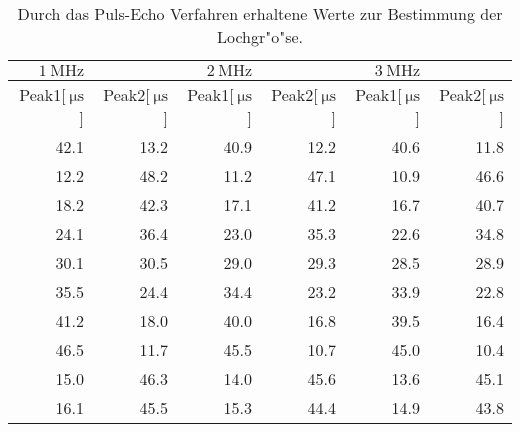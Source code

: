 
\begin{table}[!h]
\begin{center}
\begin{tabular}{|r|r|r|r|r|r|}
\hline
 $\SI{1}{\mega\hertz}$ && $\SI{2}{\mega\hertz}$ && $\SI{3}{\mega\hertz}$&\\
\hline
Peak1[$\SI{}{\micro\second}$] & Peak2[$\SI{}{\micro\second}$] & Peak1[$\SI{}{\micro\second}$] & Peak2[$\SI{}{\micro\second}$] & Peak1[$\SI{}{\micro\second}$] & Peak2[$\SI{}{\micro\second}$]\\
\hline
\hline
42.1 &	13.2 &	40.9 &	12.2 &	40.6 &	11.8\\
12.2 &	48.2 &	11.2 &	47.1 &	10.9 &	46.6\\
18.2 &	42.3 &	17.1 &	41.2 &	16.7 &	40.7\\
24.1 &	36.4 &	23.0 &	35.3 &	22.6 &	34.8\\
30.1 &	30.5 &	29.0 &	29.3 &	28.5 &	28.9\\
35.5 &	24.4 &	34.4 &	23.2 &	33.9 &	22.8\\
41.2 &	18.0 &	40.0 &	16.8 &	39.5 &	16.4\\
46.5 &	11.7 &	45.5 &	10.7 &	45.0 &	10.4\\
15.0 &	46.3 &	14.0 &	45.6 &	13.6 &	45.1\\
16.1 &	45.5 &	15.3 &	44.4 &	14.9 &	43.8\\
\hline
\end{tabular}
\caption[]{Durch das Puls-Echo Verfahren erhaltene Werte zur Bestimmung der Lochgr"o"se.}
\label{loch}
\end{center}
\end{table}